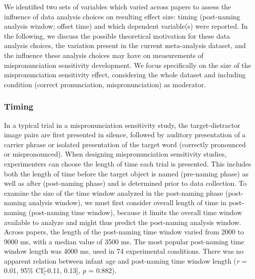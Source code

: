 \documentclass[man]{apa6}
\theoremstyle{definition}
\theoremstyle{definition}
\theoremstyle{definition}
\theoremstyle{remark}
\begin{document}
We identified two sets of variables which varied across papers to assess
the influence of data analysis choices on resulting effect size: timing
(post-naming analysis window; offset time) and which dependent
variable(s) were reported. In the following, we discuss the possible
theoretical motivation for these data analysis choices, the variation
present in the current meta-analysis dataset, and the influence these
analysis choices may have on measurements of mispronunciation
sensitivity development. We focus specifically on the size of the
mispronunciation sensitivity effect, considering the whole dataset and
including condition (correct pronunciation, mispronunciation) as
moderator.

\subsubsection{Timing}\label{timing}

In a typical trial in a mispronunciation sensitivity study, the
target-distractor image pairs are first presented in silence, followed
by auditory presentation of a carrier phrase or isolated presentation of
the target word (correctly pronounced or mispronounced). When designing
mispronunciation sensitivity studies, experimenters can choose the
length of time each trial is presented. This includes both the length of
time before the target object is named (pre-naming phase) as well as
after (post-naming phase) and is determined prior to data collection. To
examine the size of the time window analyzed in the post-naming phase
(post-naming analysis window), we must first consider overall length of
time in post-naming (post-naming time window), because it limits the
overall time window available to analyze and might thus predict the
post-naming analysis window. Across papers, the length of the
post-naming time window varied from 2000 to 9000 ms, with a median value
of 3500 ms. The most popular post-naming time window length was 4000 ms,
used in 74 experimental conditions. There was no apparent relation
between infant age and post-naming time window length (\emph{r} = 0.01,
95\% CI{[}-0.11, 0.13{]}, \emph{p} = 0.882).
\end{document}
